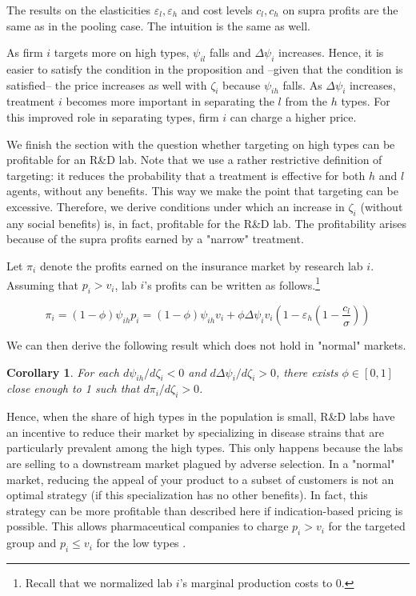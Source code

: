 \documentclass[12pt,english,a4paper]{article}
\newtheorem{corollary}{Corollary}
\begin{document}
The results on the elasticities \(\varepsilon_l, \varepsilon_h\) and cost levels \(c_l,c_h\) on supra profits are the same as in the pooling case. The intuition is the same as well.

As firm \(i\) targets more on high types, \(\psi_{il}\) falls and \(\Delta \psi_i\) increases. Hence, it is easier to satisfy the condition in the proposition and --given that the condition is satisfied-- the price increases as well with \(\zeta_i\) because \(\psi_{ih}\) falls. As \(\Delta \psi_i\) increases, treatment \(i\) becomes more important in separating the \(l\) from the \(h\) types. For this improved role in separating types, firm \(i\) can charge a higher price.

We finish the section with the question whether targeting on high types can be profitable for an R\&D lab. Note that we use a rather restrictive definition of targeting: it reduces the probability that a treatment is effective for both \(h\) and \(l\) agents, without any benefits. This way we make the point that targeting can be excessive. Therefore, we derive conditions under which an increase in \(\zeta_i\) (without any social benefits) is, in fact, profitable for the R\&D lab. The profitability arises because of the supra profits earned by a "narrow" treatment.

Let \(\pi_i\) denote the profits earned on the insurance market by research lab \(i\). Assuming that \(p_i>v_i\), lab \(i\)'s profits can be written as follows.\footnote{Recall that we normalized lab \(i\)'s marginal production costs to 0.}

\begin{equation}
\label{eq:38}
\pi_i = (1-\phi)\psi_{ih}p_i=(1-\phi)\psi_{ih}v_i+\phi\Delta\psi_iv_i (1-\varepsilon_h(1-\frac{c_l}{\sigma}))
\end{equation}

We can then derive the following result which does not hold in "normal" markets.

\begin{corollary}
\label{Targeting_profitable}
For each \(d\psi_{ih}/d\zeta_i<0\) and \(d\Delta\psi_i/d\zeta_i>0\), there exists \(\phi \in [0,1]\) close enough to 1 such that \(d\pi_i/d\zeta_i>0\).
\end{corollary}

Hence, when the share of high types in the population is small, R\&D labs have an incentive to reduce their market by specializing in disease strains that are particularly prevalent among the high types. This only happens because the labs are selling to a downstream market plagued by adverse selection. In a "normal" market, reducing the appeal of your product to a subset of customers is not an optimal strategy (if this specialization has no other benefits). In fact, this strategy can be more profitable than described here if indication-based pricing is possible. This allows pharmaceutical companies to charge \(p_i > v_i\) for the targeted group and \(p_i \leq v_i\) for the low types \citep{NBERc13994}.
\end{document}

